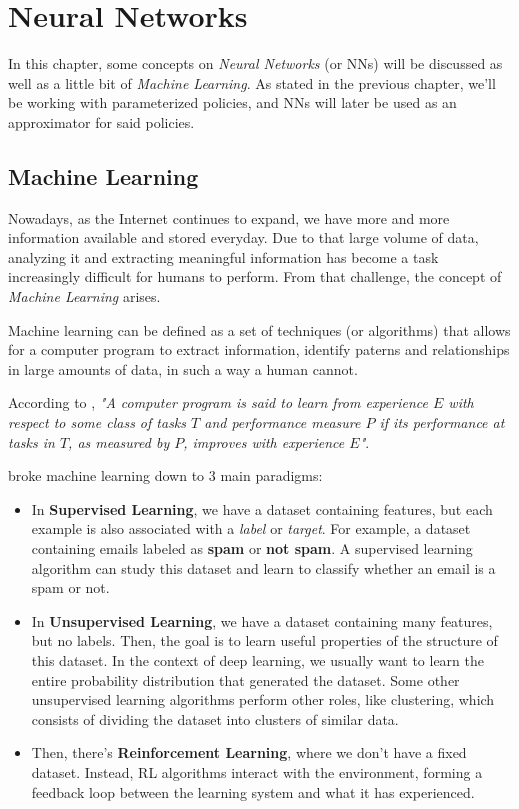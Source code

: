 
\chapter{Neural Networks}

In this chapter, some concepts on \textit{Neural Networks} (or NNs) will be discussed as well as a little bit of \textit{Machine Learning}. As stated in the previous chapter, we'll be working with parameterized policies, and NNs will later be used as an approximator for said policies.

\section{Machine Learning}
Nowadays, as the Internet continues to expand, we have more and more information available and stored everyday. Due to that large volume of data, analyzing it and extracting meaningful information has become a task increasingly difficult for humans to perform. From that challenge, the concept of \textit{Machine Learning} arises.

Machine learning can be defined as a set of techniques (or algorithms) that allows for a computer program to extract information, identify paterns and relationships in large amounts of data, in such a way a human cannot.

According to \cite{Mitchell}, \textit{"A computer program is said to learn from experience $E$ with respect to some class of tasks $T$ and performance measure $P$ if its performance at tasks in $T$, as measured by $P$, improves with experience $E$"}.

\cite{Goodfellow-et-al-2016} broke machine learning down to 3 main paradigms:
\begin{itemize}
    \item In \textbf{Supervised Learning}, we have a dataset containing features, but each example is also associated with a \textit{label} or \textit{target}. For example, a dataset containing emails labeled as \textbf{spam} or \textbf{not spam}. A supervised learning algorithm can study this dataset and learn to classify whether an email is a spam or not.
    \item In \textbf{Unsupervised Learning}, we have a dataset containing many features, but no labels. Then, the goal is to learn useful properties of the structure of this dataset. In the context of deep learning, we usually want to learn the entire probability distribution that generated the dataset. Some other unsupervised learning algorithms perform other roles, like clustering, which consists of dividing the dataset into clusters of similar data.
    \item Then, there's \textbf{Reinforcement Learning}, where we don't have a fixed dataset. Instead, RL algorithms interact with the environment, forming a feedback loop between the learning system and what it has experienced.
\end{itemize}

